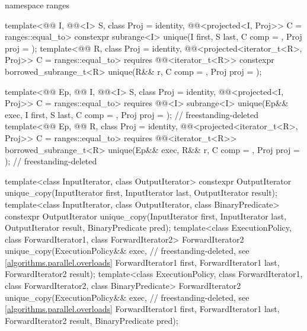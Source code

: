 \begin{codeblock}
{  namespace ranges {
    template<@@ I, @@<I> S, class Proj = identity,
             @@<projected<I, Proj>> C = ranges::equal_to>
      constexpr subrange<I> unique(I first, S last, C comp = {}, Proj proj = {});
    template<@@ R, class Proj = identity,
             @@<projected<iterator_t<R>, Proj>> C = ranges::equal_to>
      requires @@<iterator_t<R>>
      constexpr borrowed_subrange_t<R>
        unique(R&& r, C comp = {}, Proj proj = {});

    template<@@ Ep, @@ I, @@<I> S,
             class Proj = identity,
             @@<projected<I, Proj>> C = ranges::equal_to>
      requires @@<I>
      subrange<I> unique(Ep&& exec, I first, S last, C comp = {},
                         Proj proj = {});                       // freestanding-deleted
    template<@@ Ep, @@ R, class Proj = identity,
             @@<projected<iterator_t<R>, Proj>> C = ranges::equal_to>
      requires @@<iterator_t<R>>
      borrowed_subrange_t<R>
        unique(Ep&& exec, R&& r, C comp = {}, Proj proj = {});  // freestanding-deleted
  }

  template<class InputIterator, class OutputIterator>
    constexpr OutputIterator
      unique_copy(InputIterator first, InputIterator last,
                  OutputIterator result);
  template<class InputIterator, class OutputIterator, class BinaryPredicate>
    constexpr OutputIterator
      unique_copy(InputIterator first, InputIterator last,
                  OutputIterator result, BinaryPredicate pred);
  template<class ExecutionPolicy, class ForwardIterator1, class ForwardIterator2>
    ForwardIterator2
      unique_copy(ExecutionPolicy&& exec,                       // freestanding-deleted, see \ref{algorithms.parallel.overloads}
                  ForwardIterator1 first, ForwardIterator1 last,
                  ForwardIterator2 result);
  template<class ExecutionPolicy, class ForwardIterator1, class ForwardIterator2,
           class BinaryPredicate>
    ForwardIterator2
      unique_copy(ExecutionPolicy&& exec,                       // freestanding-deleted, see \ref{algorithms.parallel.overloads}
                  ForwardIterator1 first, ForwardIterator1 last,
                  ForwardIterator2 result, BinaryPredicate pred);

}
\end{codeblock}
